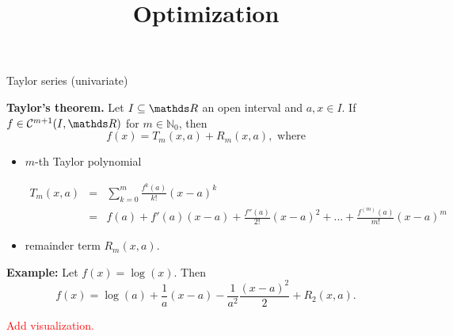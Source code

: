 





\newcommand{\titlefigure}{figure_man/differentiability_multivariate.png}
\newcommand{\learninggoals}{
\item Taylor series (univariate)
\item Hessian matrix
\item Taylor series (multivariate)}



\title{Optimization}
\author{}
\date{}



\sloppy
   
\begin{vbframe}{Taylor series (univariate)}

    \textbf{Taylor's theorem.} Let $I \subseteq \R$ an open interval and $a, x \in I$. If $f \in \mathcal{C}^{m+1}(I,\R)$ for $m \in \mathbb{N}_0$, then
    $$f(x) = T_{m}(x,a) + R_{m}(x,a), \text{ where} $$

    \begin{itemize}
      \item $m$-th Taylor polynomial
      \begin{footnotesize}
      \begin{eqnarray*}
      T_{m}(x,a) &=& \sum_{k=0}^{m} \frac{f^{k}(a)}{k!}(x-a)^{k} \\ &=& f(a) + f'(a)(x-a) + \frac{f''(a)}{2!}(x-a)^{2} + ... + \frac{f^{(m)}(a)}{m!}(x-a)^{m}
      \end{eqnarray*}
      \end{footnotesize}
    \item remainder term $R_{m}(x,a)$. 
    \end{itemize}


\framebreak 

\textbf{Example: } Let $f(x) = \log(x)$. Then
$$
  f(x) = \log(a) + \frac{1}{a} (x - a) - \frac{1}{a^2}\frac{(x - a)^2}{2} + R_2(x, a). 
 $$

 \textcolor{red}{Add visualization. }

\end{vbframe}

